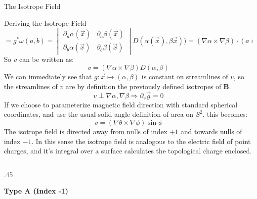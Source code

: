 \documentclass[final]{beamer}
\newlength{\onecolwid}
\begin{document}
\begin{frame}[t]
\begin{columns}[t]
\begin{column}{\onecolwid}
\begin{block}{\huge{The Isotrope Field}}
\begin{block}{Deriving the Isotrope Field}
\begin{equation}
    =g^*\omega(a,b)
    =\begin{vmatrix}
      \partial_a\alpha(\vec{x}) & \partial_a\beta(\vec{x}) \\
      \partial_b\alpha(\vec{x}) & \partial_b\beta(\vec{x})
    \end{vmatrix}
    D(\alpha(\vec{x}),\beta\vec{x}))
    =(\nabla\alpha\times\nabla\beta)\cdot(a\times b)D(\alpha,\beta)
  \end{equation}
  So $v$ can be written as:
  {\Large
  \begin{equation}
    \boxed{v=(\nabla\alpha\times\nabla\beta)D(\alpha,\beta)}
  \end{equation}
  }
  We can immediately see that $g:\vec{x}\mapsto (\alpha,\beta)$ is constant on streamlines of $v$, so the streamlines of $v$ are by definition the previously defined isotropes of $\mathbf{B}$.
  \begin{equation}
    v\perp\nabla\alpha,\nabla\beta\Rightarrow\partial_v\vec g=0
  \end{equation}
  If we choose to parameterize magnetic field direction with standard spherical coordinates,
  and use the usual solid angle definition of area on $S^2$, this becomes:
  \begin{equation}
    v=(\nabla\theta\times\nabla\phi)\sin\phi
  \end{equation}
  The isotrope field is directed away from nulls of index $+1$ and towards nulls of
  index $-1$.
  In this sense the isotrope field is analogous to the electric field of  point charges, and it's
  integral over a surface calculates the topological charge enclosed.
  \begin{columns}[t,totalwidth=\onecolwid] %
    \begin{column}{.45\onecolwid}
        \begin{centering}
        \textbf{Type A (Index -1)}
        \begin{figure}

\end{figure}
\end{centering}
\end{column}
\end{columns}
\end{block}
\end{block}
\end{column}
\end{columns}
\end{frame}
\end{document}
